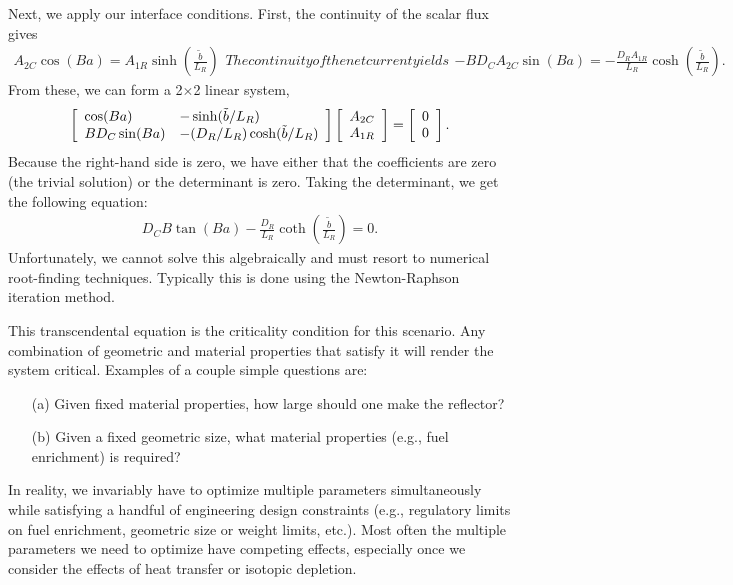 Next, we apply our interface conditions. First, the continuity of the scalar flux gives
\begin{subequations}
\begin{align}
  A_{2C} \cos( B a ) = A_{1R} \sinh\left( \frac{\tilde{b}}{L_R} \right)
\end{align}
The continuity of the net current yields
\begin{align}
  -B D_C A_{2C} \sin( B a ) = -\frac{D_R A_{1R}}{L_R} \cosh\left( \frac{\tilde{b}}{L_R} \right) .
\end{align}
\end{subequations}
From these, we can form a 2$\times$2 linear system,
\begin{align}
  \left[ \begin{array}{l l}
  \cos( B a )		& -\sinh( \tilde{b}/L_R ) \\
  B D_C \sin( B a )	& -( D_R / L_R ) \cosh( \tilde{b}/L_R ) \\ \end{array} \right] 
  \left[ \begin{array}{l l} A_{2C} \\ A_{1R} \end{array} \right] =
  \left[ \begin{array}{l l} 0 \\ 0 \end{array} \right] .
\end{align}
Because the right-hand side is zero, we have either that the coefficients are zero (the trivial solution) or the determinant is zero. Taking the determinant, we get the following equation:
\begin{align}
  D_C B \tan( B a ) - \frac{D_R}{L_R} \coth\left( \frac{\tilde{b}}{L_R} \right) = 0.
\end{align}
Unfortunately, we cannot solve this algebraically and must resort to numerical root-finding techniques. Typically this is done using the Newton-Raphson iteration method.

This transcendental equation is the criticality condition for this scenario. Any combination of geometric and material properties that satisfy it will render the system critical. Examples of a couple simple questions are:
\begin{enumerate}
  \item[(a)] Given fixed material properties, how large should one make the reflector?
  \item[(b)] Given a fixed geometric size, what material properties (e.g., fuel enrichment) is required?
\end{enumerate}
In reality, we invariably have to optimize multiple parameters simultaneously while satisfying a handful of engineering design constraints (e.g., regulatory limits on fuel enrichment, geometric size or weight limits, etc.). Most often the multiple parameters we need to optimize have competing effects, especially once we consider the effects of heat transfer or isotopic depletion.

